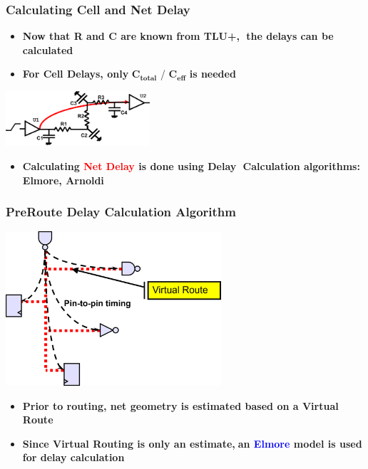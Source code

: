 \documentclass[compress]{beamer}
\begin{document}
\begin{frame}
	\frametitle{Calculating Cell and Net Delay}
	\begin{itemize}
		\item \textbf{Now that R and C are known from TLU+, the delays can be calculated}
		\item\textbf{ For Cell Delays, only} $\textbf{C}_{\textbf{total}}$ / $\textbf{C}_{\textbf{eff}}$ \textbf{is needed}
	\end{itemize}
		\begin{center}
			\includegraphics[width=0.4\textwidth]{NET}
		\end{center}
		\begin{itemize}	
		\item \textbf{Calculating \textcolor{red}{Net Delay} is done using Delay Calculation algorithms: Elmore, Arnoldi}
	\end{itemize}
\end{frame}
\begin{frame}
	\frametitle{PreRoute Delay Calculation Algorithm}
	\begin{center}
		\includegraphics[width=0.6\textwidth]{ELMORE}
	\end{center}
	\begin{itemize}
		\item \textbf{Prior to routing, net geometry is estimated based on a Virtual Route}
		\item \textbf{Since Virtual Routing is only an estimate,an \textcolor{blue}{Elmore} model is used for delay calculation}
		
	\end{itemize}
\end{frame}
\end{document}

